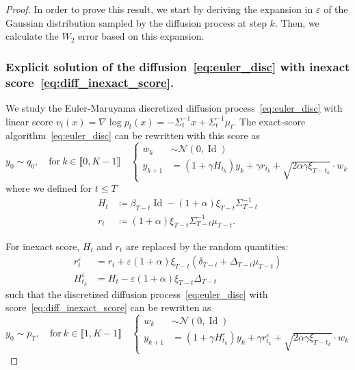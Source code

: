 \documentclass[11pt]{article}
\newcommand{\eqdef}{\coloneqq}
\newcommand{\id}{\operatorname{Id}}
\begin{document}
\begin{proof}


In order to prove this result, we start by deriving the expansion in $\varepsilon$ of the Gaussian distribution sampled by the diffusion process at step $k$. Then, we calculate the $W_2$ error based on this expansion. 

\subsubsection{Explicit solution of the diffusion~\eqref{eq:euler_disc} with inexact score~\eqref{eq:diff_inexact_score}.}

We study the Euler-Maruyama discretized diffusion process~\eqref{eq:euler_disc} with linear score $v_t(x) = \nabla \log p_t(x) = - \Sigma_t^{-1} x + \Sigma_t^{-1} \mu_t$. The exact-score algorithm~\eqref{eq:euler_disc} can be rewritten with this score as
\begin{equation} \label{eq:with_Ht}
    y_0 \sim q_0, \quad  \text{for} \  k \in \llbracket 0, K-1 \rrbracket \quad 
    \left\{
    \begin{aligned}
        w_k &\sim \mathcal{N}(0, \id) \\
        y_{k+1} &= (1 + \gamma H_{t_k})y_k + \gamma r_{t_k}  + \sqrt{2 \alpha \gamma \xi_{T-t_k}} \cdot w_k
    \end{aligned}
    \right.
\end{equation}
where we defined for $t \leq T$
\begin{align} 
H_t &\eqdef \beta_{T-t}\id - (1 + \alpha) \xi_{T-t} \Sigma_{T-t}^{-1} \label{eq:H_t}\\
 r_t &\eqdef (1 + \alpha) \xi_{T-t} \Sigma_{T-t}^{-1} \mu_{T-t}. \label{eq:r_t}
\end{align}

For inexact score, $H_t$ and $r_t$ are replaced by the random quantities:
\begin{align*}
    r^\varepsilon_{t} 
    &= r_{t} + \varepsilon (1+\alpha)\xi_{T-{t}} (\delta_{T-t} + \Delta_{T-t}\mu_{T-{t}}) \\
    H^\varepsilon_{t_k} 
    & = H_{t} - \varepsilon (1 + \alpha) \xi_{T-t}\Delta_{T-t}
\end{align*}
such that the discretized diffusion process~\eqref{eq:euler_disc} with score~\eqref{eq:diff_inexact_score} can be rewritten as
\begin{equation} \label{eq:euler_disc_linear_pert_app}
    y_0 \sim p_T, \quad  \text{for} \  k \in \llbracket 1, K-1 \rrbracket \quad 
    \left\{
    \begin{aligned}
        w_k &\sim \mathcal{N}(0, \id) \\
        y_{k+1} &= (1 + \gamma H^{\varepsilon}_{t_k})y_k + \gamma r^{\varepsilon}_{t_k}  + \sqrt{2 \alpha \gamma \xi_{T-t_k}} \cdot w_k
    \end{aligned}
    \right.
\end{equation}


\end{proof}
\end{document}
